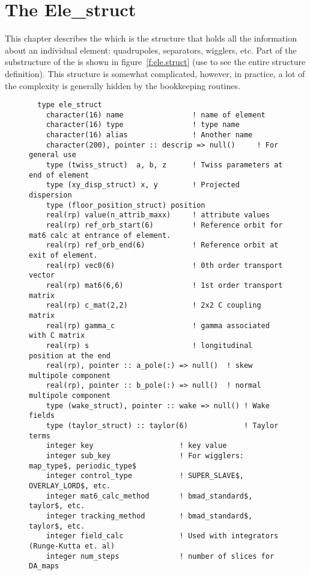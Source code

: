 \chapter{The Ele_struct}
\label{c:ele.struct}

This chapter describes the  which is the structure that
holds all the information about an individual element: quadrupoles,
separators, wigglers, etc. 
Part of the substructure of the  is shown
in figure~\ref{f:ele.struct} (use  to see the entire structure 
definition). This structure is somewhat
complicated, however, in practice, a lot of the complexity is
generally hidden  by the \bmad bookkeeping routines.

\begin{figure}[htb]
\centering
\small
\begin{verbatim}
  type ele_struct
    character(16) name                ! name of element
    character(16) type                ! type name
    character(16) alias               ! Another name
    character(200), pointer :: descrip => null()     ! For general use
    type (twiss_struct)  a, b, z      ! Twiss parameters at end of element
    type (xy_disp_struct) x, y        ! Projected dispersion
    type (floor_position_struct) position
    real(rp) value(n_attrib_maxx)     ! attribute values
    real(rp) ref_orb_start(6)         ! Reference orbit for mat6 calc at entrance of element.
    real(rp) ref_orb_end(6)           ! Reference orbit at exit of element.
    real(rp) vec0(6)                  ! 0th order transport vector
    real(rp) mat6(6,6)                ! 1st order transport matrix
    real(rp) c_mat(2,2)               ! 2x2 C coupling matrix
    real(rp) gamma_c                  ! gamma associated with C matrix
    real(rp) s                        ! longitudinal position at the end
    real(rp), pointer :: a_pole(:) => null()  ! skew multipole component
    real(rp), pointer :: b_pole(:) => null()  ! normal multipole component
    type (wake_struct), pointer :: wake => null() ! Wake fields
    type (taylor_struct) :: taylor(6)             ! Taylor terms
    integer key                    ! key value
    integer sub_key                ! For wigglers: map_type$, periodic_type$
    integer control_type           ! SUPER_SLAVE$, OVERLAY_LORD$, etc.
    integer mat6_calc_method       ! bmad_standard$, taylor$, etc.
    integer tracking_method        ! bmad_standard$, taylor$, etc.
    integer field_calc             ! Used with integrators (Runge-Kutta et. al)
    integer num_steps              ! number of slices for DA_maps

\end{verbatim}
\end{figure}
